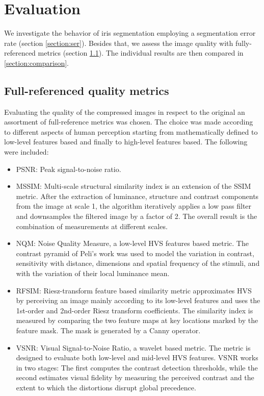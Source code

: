 \documentclass[10pt,twocolumn,letterpaper]{article}
\begin{document}
\section{Evaluation}
\label{section:eval}
 We investigate the behavior of iris segmentation employing a segmentation error rate (section \ref{section:ser}). Besides that, we assess the image quality with fully-referenced metrics (section \ref{section:fulRef}). The individual results are then compared in \ref{section:comparison}.


\subsection{Full-referenced quality metrics}
\label{section:fulRef}
Evaluating the quality of the compressed images in respect to the original an assortment of full-reference metrics was chosen. The choice was made according to different aspects of human perception starting from mathematically defined to low-level features based and finally to high-level features based. The following were included: 
 
\begin{itemize}
 \item PSNR: Peak signal-to-noise ratio.
 \item MSSIM\cite{Wangsa}: Multi-scale structural similarity index  is an extension of the SSIM metric. After the extraction of luminance, structure and contrast components from the image at scale 1, the algorithm iteratively applies a low pass filter and downsamples the
 filtered image by a factor of 2. The overall result is the combination of measurements at different scales.
 \item NQM\cite{Dameraa}: Noise Quality Measure, a low-level HVS features based metric. The contrast pyramid of Peli’s work was used to model the variation in contrast, sensitivity with distance, dimensions and spatial frequency of the stimuli, and with the variation of their local luminance mean.
 \item RFSIM\cite{Zhanga}: Riesz-transform feature based similarity metric approximates HVS by perceiving an image mainly according to its low-level features and uses the 1st-order and 2nd-order Riesz transform coefficients. The similarity index is measured by comparing the two feature maps at key locations marked by the feature mask. The mask is generated by a Canny operator.
 \item VSNR\cite{Chandlera}: Visual Signal-to-Noise Ratio, a wavelet based
 metric. The metric is designed to evaluate both low-level and
 mid-level HVS features. VSNR works in two stages: The first computes the contrast detection thresholds, while the second estimates visual fidelity by measuring the perceived contrast and the extent to which
 the distortions disrupt global precedence.
 
\end{itemize}
\end{document}
